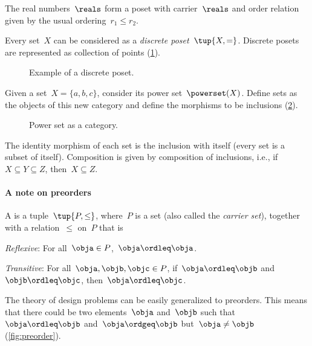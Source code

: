 \begin{example}[Reals]
  The real numbers~$\reals$ form a poset with carrier~$\reals$ and order relation given by the usual ordering~$r_1 \leq r_2$.
\end{example}

\begin{example}
  \label{ex:discreteposet}
  Every set~$X$ can be considered as a \emph{discrete poset}~$\tup{X,=}$. Discrete posets are represented as collection of points (\cref{fig:discretepos}).

  \begin{figure}[tbh]
    \centering
    \caption{Example of a discrete poset. \label{fig:discretepos}}
  \end{figure}

  \begin{example}
    \label{ex:hasseinclusion}
    Given a set~$X=\{a,b,c\}$, consider its power set~$\powerset(X)$. Define sets as the objects of this new category and define the morphisms to be inclusions (\cref{fig:powersetcat}).

    \begin{figure}[h!]
      \begin{center}
      \end{center}
      \caption{Power set as a category. \label{fig:powersetcat}}
    \end{figure}

    The identity morphism of each set is the inclusion with itself (every set is a subset of itself). Composition is given by composition of inclusions, i.e., if~$X\subseteq Y \subseteq Z$, then~$X\subseteq Z$.
  \end{example}
\end{example}

\paragraph{A note on preorders}
\begin{definition}[Preorder]
  \label{def:preorder}
  A \emph{} is a tuple~$\tup{P, \leq}$,
  where~$P$ is a set (also called the \emph{carrier set}), together with a
  relation~$\leq$ on~$P$ that is
  \begin{compactenum}
    \item \emph{Reflexive}: For all~$\obja\in P$,~$\obja\ordleq \obja$.
    \item \emph{Transitive}: For all~$\obja,\objb,\objc\in P$, if~$\obja\ordleq \objb$ and~$\objb\ordleq \objc$, then~$\obja\ordleq \objc$.
  \end{compactenum}
\end{definition}
The theory of design problems can be easily generalized to preorders. This means that there could be two elements~$\obja$ and~$\objb$ such that~$\obja\ordleq \objb$ and~$\obja \ordgeq \objb$ but~$\obja \neq \objb$ (\cref{fig:preorder}).

